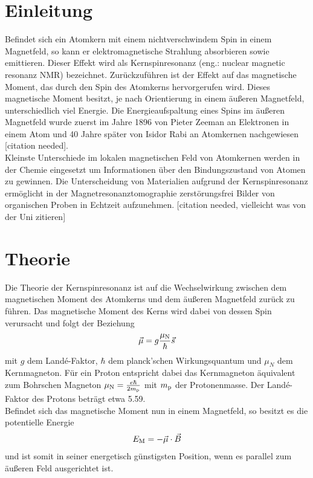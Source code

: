 \documentclass[paper=a4,
	fontsize=10pt,
	DIV=18,
	twocolumn,
	parskip=half
	]{scrartcl}
\numberwithin{equation}{section}    %
\begin{document}
\section{Einleitung}
\label{Einleitung}
%
Befindet sich ein Atomkern mit einem nichtverschwindem Spin in einem Magnetfeld, so kann er elektromagnetische Strahlung absorbieren sowie emittieren. Dieser Effekt wird als Kernspinresonanz (eng.: nuclear magnetic resonanz NMR) bezeichnet.
Zurückzuführen ist der Effekt auf das magnetische Moment, das durch den Spin des Atomkerns hervorgerufen wird. Dieses magnetische Moment besitzt, je nach Orientierung in einem äußeren Magnetfeld, unterschiedlich viel Energie. 
Die Energieaufspaltung eines Spins im äußeren Magnetfeld wurde zuerst im Jahre 1896 von Pieter Zeeman an Elektronen in einem Atom und 40 Jahre später von Isidor Rabi an Atomkernen nachgewiesen [citation needed].\\
Kleinste Unterschiede im lokalen magnetischen Feld von Atomkernen werden in der Chemie eingesetzt um Informationen über den Bindungszustand von Atomen zu gewinnen. Die Unterscheidung von Materialien aufgrund der Kernspinresonanz ermöglicht in der Magnetresonanztomographie zerstörungsfrei Bilder von organischen Proben in Echtzeit aufzunehmen. [citation needed, vielleicht was von der Uni zitieren]


%
\section{Theorie}
\label{Theorie}
%
\label{theorie}
Die Theorie der Kernspinresonanz ist auf die Wechselwirkung zwischen dem magnetischen Moment des Atomkerns und dem äußeren Magnetfeld zurück zu führen.
Das magnetische Moment des Kerns wird dabei von dessen Spin verursacht und folgt der Beziehung
\begin{align}
\vec{\mu}=g \frac{\mu_{\rm N}}{\hbar}\vec{s}
\end{align}
mit $g$ dem Landé-Faktor, $\hbar$ dem planck'schen Wirkungsquantum und $\mu_N$ dem Kernmagneton. Für ein Proton entspricht dabei das Kernmagneton äquivalent zum Bohrschen Magneton $\mu_{\rm N}=\frac{e \hbar}{2m_{\rm p}}$ mit $m_{\rm p}$ der Protonenmasse. Der Landé-Faktor des Protons beträgt etwa 5.59.\\
Befindet sich das magnetische Moment nun in einem Magnetfeld, so besitzt es die potentielle Energie 
\begin{align}
E_{\rm M}=-\vec{\mu} \cdot \vec{B}
\end{align}
und ist somit in seiner energetisch günstigsten Position, wenn es parallel zum äußeren Feld ausgerichtet ist.
\end{document}
